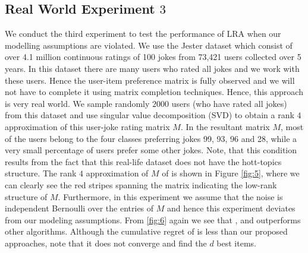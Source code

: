 \subsection{Real World Experiment $3$}
We conduct the third experiment to test the performance of LRA when our modelling assumptions are violated. We use the Jester dataset \citep{goldberg2001eigentaste} which consist of over 4.1 million continuous ratings of 100 jokes from 73,421 users collected over 5 years. In this dataset there are many users who rated all jokes and we work with these users. Hence the user-item preference matrix is fully observed and we will not have to complete it using matrix completion techniques. Hence, this approach is very real world. We sample randomly $2000$ users (who have rated all jokes) from this dataset and use singular value decomposition (SVD) to obtain a rank $4$ approximation of this user-joke rating matrix $M$. In the resultant matrix $M$, most of the users belong to the four classes preferring jokes 99, 93, 96 and 28, while a very small percentage of users prefer some other jokes. Note, that this condition results from the fact that this real-life dataset does not have the hott-topics structure. The rank $4$ approximation of $M$ of  is shown in Figure \ref{fig:5}, where we can clearly see the red stripes spanning the matrix indicating the low-rank structure of $M$. Furthermore, in this experiment we assume that the noise is independent Bernoulli over the entries of $M$ and hence this experiment deviates from our modeling assumptions. From \ref{fig:6} again we see that \LRAEXP, \LRATS and \LRAUCB outperforms other algorithms. Although the cumulative regret of \NMFBan is less than our proposed approaches, note that it does not converge and find the $d$ best items.




